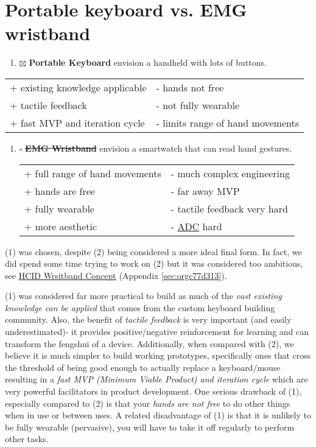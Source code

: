 \documentclass[logo,bsc,singlespacing,parskip]{infthesis}
\begin{document}
\section{Portable keyboard vs. EMG wristband}
\label{sec:org31cd12f}
\begin{enumerate}
\item{$\boxtimes$} \textbf{Portable Keyboard} envision a handheld with lots of buttons.
\end{enumerate}
\begin{longtable}{|p{6.25cm}|p{6.25cm}|}
\hline
+ existing knowledge applicable & - hands not free\\
+ tactile feedback & - not fully wearable\\
+ fast MVP and iteration cycle & - limits range of hand movements\\
\hline
\end{longtable}
\begin{enumerate}
\item{$\square$} \sout{\textbf{EMG Wristband}} envision a smartwatch that can read hand gestures.
\begin{longtable}{|p{6.25cm}|p{6.25cm}|}
\hline
+ full range of hand movements & - much complex engineering\\
+ hands are free & - far away MVP\\
+ fully wearable & - tactile feedback very hard\\
+ more aesthetic & - \hyperref[orgac94761]{ADC} hard\\
\hline
\end{longtable}
\end{enumerate}

(1) was chosen, despite (2) being considered a more ideal final form.
In fact, we did spend some time trying to work on (2) but it was considered too ambitious, see \hyperref[sec:orgc77d313]{HCID Wrsitband Concept} (Appendix \ref{sec:orgc77d313}).

(1) was considered far more practical to build as much of the \emph{vast existing knowledge can be applied} that comes from the custom keyboard building community.
Also, the benefit of \emph{tactile feedback} is very important (and easily underestimated)- it provides positive/negative reinforcement for learning and can transform the fengshui of a device.
Additionally, when compared with (2), we believe it is much simpler to build working prototypes, specifically ones that cross the threshold of being good enough to actually replace a keyboard/mouse resulting in a \emph{fast MVP (Minimum Viable Product) and iteration cycle} which are very powerful facilitators in product development.
One serious drawback of (1), especially compared to (2) is that your \emph{hands are not free} to do other things when in use or between uses. A related disadvantage of (1) is that it is unlikely to be fully wearable (pervasive), you will have to take it off regularly to perform other tasks.
\end{document}
